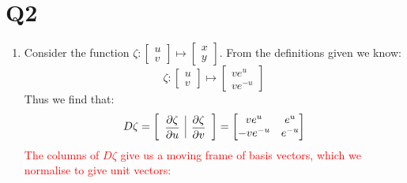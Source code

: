 \documentclass[a4paper, 11pt]{article}
\begin{document}
\section*{Q2}
\begin{enumerate}[label=(\alph*)]
  \item Consider the function $\zeta: \begin{bmatrix}
            u \\ v
          \end{bmatrix} \mapsto \begin{bmatrix}
            x \\ y
          \end{bmatrix}$. From the definitions given we know:
        $$
          \zeta: \begin{bmatrix}
            u \\v
          \end{bmatrix} \mapsto \begin{bmatrix}
            ve^u \\
            ve^{-u}
          \end{bmatrix}
        $$
        Thus we find that:
        $$
          D\zeta = \left[ \begin{array}{c|c}\dfrac{\partial\zeta}{\partial u}& \dfrac{\partial\zeta}{\partial v}\end{array} \right] = \begin{bmatrix}
            ve^u     & e^u    \\
            -ve^{-u} & e^{-u} \\
          \end{bmatrix}
        $$
        \textcolor{red}{
          The columns of $D\zeta$ give us a moving frame of basis vectors, which we normalise to give unit vectors:
        }


\end{enumerate}
\end{document}
